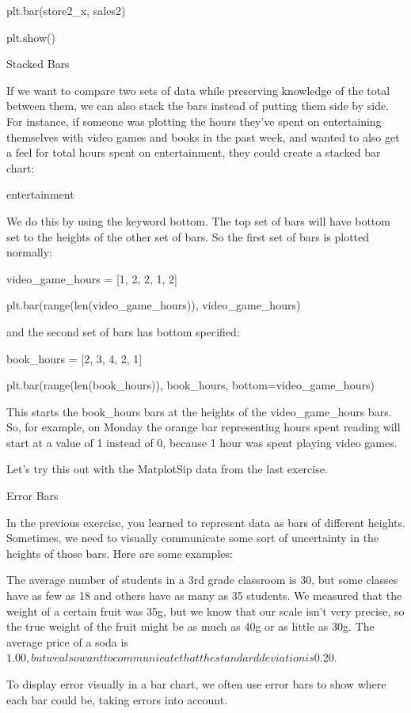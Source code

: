\documentclass{journal}
\begin{document}
plt.bar(store2_x, sales2)

plt.show()



Stacked Bars

If we want to compare two sets of data while preserving knowledge of the total between them, we can also stack the bars instead of putting them side by side. For instance, if someone was plotting the hours they’ve spent on entertaining themselves with video games and books in the past week, and wanted to also get a feel for total hours spent on entertainment, they could create a stacked bar chart:

entertainment

We do this by using the keyword bottom. The top set of bars will have bottom set to the heights of the other set of bars. So the first set of bars is plotted normally:

video_game_hours = [1, 2, 2, 1, 2]

plt.bar(range(len(video_game_hours)),
  video_game_hours) 

and the second set of bars has bottom specified:

book_hours = [2, 3, 4, 2, 1]

plt.bar(range(len(book_hours)),
  book_hours,
  bottom=video_game_hours)

This starts the book_hours bars at the heights of the video_game_hours bars. So, for example, on Monday the orange bar representing hours spent reading will start at a value of 1 instead of 0, because 1 hour was spent playing video games.

Let’s try this out with the MatplotSip data from the last exercise.



Error Bars

In the previous exercise, you learned to represent data as bars of different heights. Sometimes, we need to visually communicate some sort of uncertainty in the heights of those bars. Here are some examples:

    The average number of students in a 3rd grade classroom is 30, but some classes have as few as 18 and others have as many as 35 students.
    We measured that the weight of a certain fruit was 35g, but we know that our scale isn’t very precise, so the true weight of the fruit might be as much as 40g or as little as 30g.
    The average price of a soda is $1.00, but we also want to communicate that the standard deviation is $0.20.

To display error visually in a bar chart, we often use error bars to show where each bar could be, taking errors into account.
\end{document}
